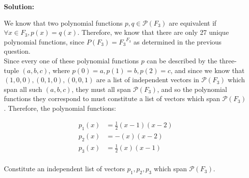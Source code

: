 \documentclass[10pt]{article}
\newcounter{question}
\newenvironment{solution}{
	\vspace{1em}\par\large\textbf{{Solution:}}\par\vspace{1em}
}{
	\vspace{1em}
	\newpage
}
\begin{document}
\begin{solution}
	We know that two polynomial functions $p, q \in \mathcal{P}(F_3)$ are equivalent if $\forall x \in F_3, p(x) = q(x)$. Therefore, we know that there are only 27 unique polynomial functions, since $P(F_3) = {F_3}^{F_3}$ as determined in the previous question. \\

	Since every one of these polynomial functions $p$ can be described by the three-tuple $(a, b, c)$, where $p(0) = a, p(1) = b, p(2) = c$, and since we know that $(1, 0, 0), (0, 1, 0), (0, 0, 1)$ are a list of independent vectors in $\mathcal{P}(F_3)$ which span all such $(a, b, c)$, they must all span $\mathcal{P}(F_3)$, and so the polynomial functions they correspond to must constitute a list of vectors which span $\mathcal{P}(F_3)$. Therefore, the polynomial functions:

	\begin{align*}
		p_1(x) &= \frac{1}{2}(x - 1)(x - 2) \\
		p_2(x) &= -(x)(x - 2) \\
		p_3(x) &= \frac{1}{2}(x)(x - 1) \\
	\end{align*}

	Constitute an independent list of vectors $p_1, p_2, p_3$ which span $\mathcal{P}(F_3)$.
\end{solution}
\end{document}
